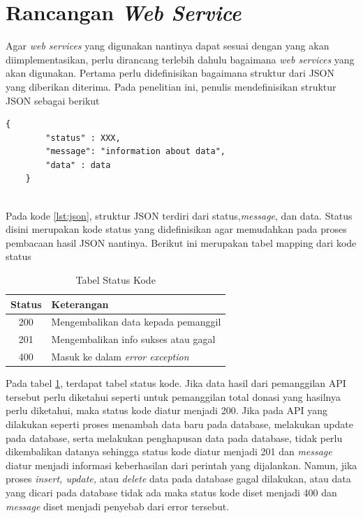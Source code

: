 \section{Rancangan \textit{Web Service}}

	Agar \textit{web services} yang digunakan nantinya dapat sesuai dengan yang akan diimplementasikan, perlu dirancang terlebih dahulu bagaimana \textit{web services} yang akan digunakan. Pertama perlu didefinisikan bagaimana struktur dari JSON yang diberikan diterima. Pada penelitian ini, penulis mendefinisikan struktur JSON sebagai berikut
	
	\begin{minipage}{\linewidth}
	\begin{lstlisting}[caption={Struktur JSON \textit{web services}}, label={lst:json}]
	{
		"status" : XXX,
		"message": "information about data",
		"data" : data
	}
	\end{lstlisting}
	\end{minipage} \\

	Pada kode \ref{lst:json}, struktur JSON terdiri dari status,\textit{message}, dan data. Status disini merupakan kode status yang didefinisikan agar memudahkan pada proses pembacaan hasil JSON nantinya. Berikut ini merupakan tabel mapping dari kode status
	
	\begin{table}
		\centering
		\caption{Tabel Status Kode}
		\label{tab:statuscode}
		\begin{tabular}{| c | l |}
			\hline
			Status & Keterangan \\ 
			\hline
			200 & Mengembalikan data kepada pemanggil \\
			201 & Mengembalikan info sukses atau gagal \\
			400 & Masuk ke dalam \textit{error exception} \\
			\hline
		\end{tabular}
	\end{table}
	
	Pada tabel \ref{tab:statuscode}, terdapat tabel status kode. Jika data hasil dari pemanggilan API tersebut perlu diketahui seperti untuk pemanggilan total donasi yang hasilnya perlu diketahui, maka status kode diatur menjadi 200. Jika pada API yang dilakukan seperti proses menambah data baru pada database, melakukan update pada database, serta melakukan penghapusan data pada database, tidak perlu dikembalikan datanya sehingga status kode diatur menjadi 201 dan \textit{message} diatur menjadi informasi keberhasilan dari perintah yang dijalankan. Namun, jika proses \textit{insert, update,} atau \textit{delete} data pada database gagal dilakukan, atau data yang dicari pada database tidak ada maka status kode diset menjadi 400 dan \textit{message} diset menjadi penyebab dari error tersebut.
	
